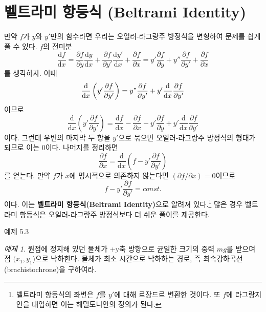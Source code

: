 \documentclass[chapter, oneside, b5paper]{oblivoir}
\theoremstyle{plain}
\theoremstyle{definition}
\theoremstyle{remark}
\newtheorem{example}{예제}[chapter]    %
\begin{document}
\section{벨트라미 항등식 (Beltrami Identity)}
만약 $f$가 $y$와 $y'$만의 함수라면 우리는 오일러-라그랑주 방정식을 변형하여 문제를 쉽게 풀 수 있다. $f$의 전미분
\begin{equation}
    \frac{\mathrm{d}f}{\mathrm{d}x} = \frac{\partial f}{\partial y}\frac{\mathrm{d}y}{\mathrm{d}x} + \frac{\partial f}{\partial y'}\frac{\mathrm{d}y'}{\mathrm{d}x} + \frac{\partial f}{\partial x} = y'\frac{\partial f}{\partial y} + y''\frac{\partial f}{\partial y'} + \frac{\partial f}{\partial x}
\end{equation}
를 생각하자. 이때
\begin{equation*}
    \frac{\mathrm{d}}{\mathrm{d}x} \left( y' \frac{\partial f}{\partial y'} \right) = y"\frac{\partial f}{\partial y'} + y' \frac{\mathrm{d}}{\mathrm{d}x}\frac{\partial f}{\partial y'}
\end{equation*}
이므로
\begin{equation}
    \frac{\mathrm{d}}{\mathrm{d}x} \left( y' \frac{\partial f}{\partial y'} \right) = \frac{\mathrm{d}f}{\mathrm{d}x} - \frac{\partial f}{\partial x} - y'\frac{\partial f}{\partial y} + y' \frac{\mathrm{d}}{\mathrm{d}x}\frac{\partial f}{\partial y'}
\end{equation}
이다. 그런데 우변의 마지막 두 항을 $y'$으로 묶으면 오일러-라그랑주 방정식의 형태가 되므로 이는 0이다. 나머지를 정리하면
\begin{equation}
    \frac{\partial f}{\partial x} =  \frac{\mathrm{d}}{\mathrm{d}x} \left(f- y' \frac{\partial f}{\partial y'} \right)
\end{equation}
를 얻는다. 만약 $f$가 $x$에 명시적으로 의존하지 않는다면 $(\partial f / \partial x) =0$이므로
\begin{equation}
    f- y' \frac{\partial f}{\partial y'} = const.
\end{equation}
이다. 이는 \textbf{벨트라미 항등식(Beltrami Identity)}으로 알려져 있다.\footnote{벨트라미 항등식의 좌변은 $f$를 $y'$에 대해 르장드르 변환한 것이다. 또 $f$에 라그랑지안을 대입하면 이는 해밀토니안의 정의가 된다.} 많은 경우 벨트라미 항등식은 오일러-라그랑주 방정식보다 더 쉬운 풀이를 제공한다.

\begin{examplebox}{예제 5.3}
\begin{example}
원점에 정지해 있던 물체가 +y축 방향으로 균일한 크기의 중력 $mg$를 받으며 점 $(x_1, y_1$)으로 낙하한다. 물체가 최소 시간으로 낙하하는 경로, 즉 최속강하곡선(brachistochrone)을 구하여라.
\end{example}
\end{examplebox}
\end{document}

